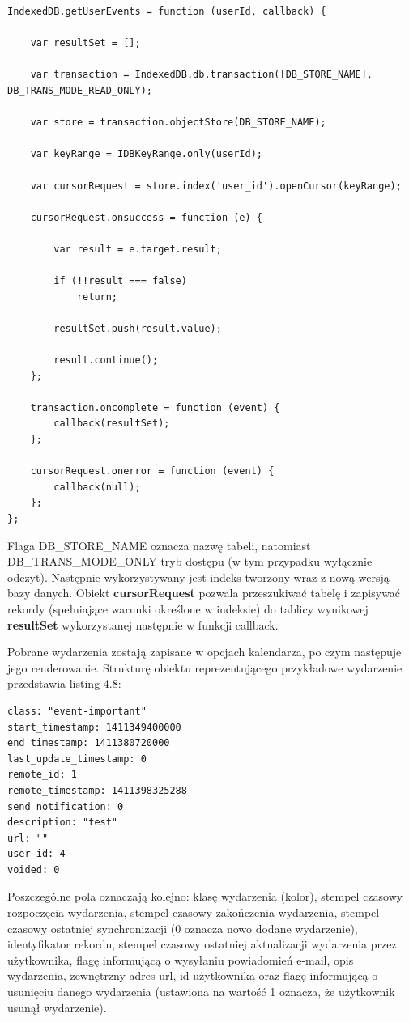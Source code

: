 \begin{lstlisting}[style=js, caption=Pobranie wydarzeń użytkownika., label=amb, captionpos=b]
IndexedDB.getUserEvents = function (userId, callback) {

    var resultSet = [];

    var transaction = IndexedDB.db.transaction([DB_STORE_NAME], DB_TRANS_MODE_READ_ONLY);

    var store = transaction.objectStore(DB_STORE_NAME);

    var keyRange = IDBKeyRange.only(userId);

    var cursorRequest = store.index('user_id').openCursor(keyRange);

    cursorRequest.onsuccess = function (e) {

        var result = e.target.result;

        if (!!result === false)
            return;

        resultSet.push(result.value);

        result.continue();
    };

    transaction.oncomplete = function (event) {
        callback(resultSet);
    };

    cursorRequest.onerror = function (event) {
        callback(null);
    };
};
\end{lstlisting}

Flaga DB\_STORE\_NAME oznacza nazwę tabeli, natomiast DB\_TRANS\_MODE\_ONLY tryb dostępu (w tym przypadku wyłącznie odczyt). Następnie wykorzystywany jest indeks tworzony wraz z nową wersją bazy danych. Obiekt \textbf{cursorRequest} pozwala przeszukiwać tabelę i zapisywać rekordy (spełniające warunki określone w indeksie) do tablicy wynikowej \textbf{resultSet} wykorzystanej następnie w funkcji callback.

Pobrane wydarzenia zostają zapisane w opcjach kalendarza, po czym następuje jego renderowanie. Strukturę obiektu reprezentującego przykładowe wydarzenie przedstawia listing 4.8:

\begin{lstlisting}[style=js, caption=Struktura obiektu reprezentującego wydarzenie., label=amb, captionpos=b]
class: "event-important"
start_timestamp: 1411349400000
end_timestamp: 1411380720000
last_update_timestamp: 0
remote_id: 1
remote_timestamp: 1411398325288
send_notification: 0
description: "test"
url: ""
user_id: 4
voided: 0
\end{lstlisting}

Poszczególne pola oznaczają kolejno: klasę wydarzenia (kolor), stempel czasowy rozpoczęcia wydarzenia, stempel czasowy zakończenia wydarzenia, stempel czasowy ostatniej synchronizacji (0 oznacza nowo dodane wydarzenie), identyfikator rekordu, stempel czasowy ostatniej aktualizacji wydarzenia przez użytkownika, flagę informującą o wysyłaniu powiadomień \mbox{e-mail}, opis wydarzenia, zewnętrzny adres url, id użytkownika oraz flagę informującą o usunięciu danego wydarzenia (ustawiona na wartość 1 oznacza, że użytkownik usunął wydarzenie).

